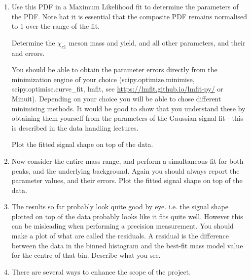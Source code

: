 \begin{enumerate}
\item	Use this PDF in a Maximum Likelihood fit to determine the parameters of the PDF. Note hat it is essential that the composite PDF remains normalised to 1 over the range of the fit.

Determine the $\chi_{c1}$  meson mass and yield, and all other parameters, and their and errors.

You should be able to obtain the parameter errors directly from the minimization engine of your choice (scipy.optimize.minimise, scipy.optimise.curve\_fit, lmfit, see \url{https://lmfit.github.io/lmfit-py/} or Minuit). Depending on your choice you will be able to chose different minimising methods.
It would be good to show that you understand these by obtaining them yourself from the parameters of the Gaussian signal fit - this is described in the data handling lectures.

Plot the fitted signal shape on top of the data.

\item Now consider the entire mass range, and perform a simultaneous fit for both
peaks, and the underlying background. Again you should always report the parameter
values, and their errors. Plot the fitted signal shape on top of the data.
\item The results so far probably look quite good by eye. i.e. the signal shape plotted on
top of the data probably looks like it fits quite well. However this can be misleading
when performing a precision measurement. You should make a plot of what are called
the residuals. A residual is the difference between the data in the binned histogram
and the best-fit mass model value for the centre of that bin. Describe what you see.
\item There are several ways to enhance the scope of the project.


\end{enumerate}
